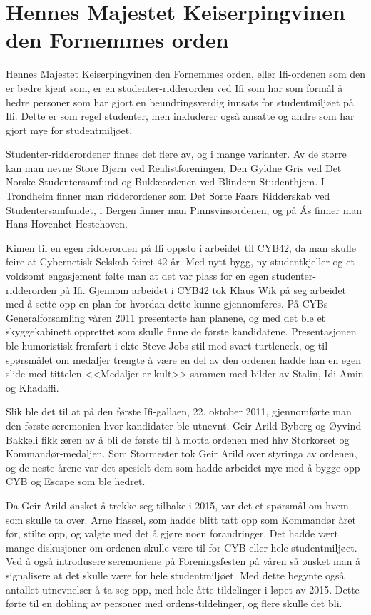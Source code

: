 \chapter[Ifi-ordenen]{Hennes Majestet Keiserpingvinen den Fornemmes orden}

\author{Skrevet av Arne Hassel}

Hennes Majestet Keiserpingvinen den Fornemmes orden, eller Ifi-ordenen som den er bedre kjent som, er en studenter-ridderorden ved Ifi som har som formål å hedre personer som har gjort en beundringsverdig innsats for studentmiljøet på Ifi. Dette er som regel studenter, men inkluderer også ansatte og andre som har gjort mye for studentmiljøet.

Studenter-ridderordener finnes det flere av, og i mange varianter. Av de større kan man nevne Store Bjørn ved Realistforeningen, Den Gyldne Gris ved Det Norske Studentersamfund og Bukkeordenen ved Blindern Studenthjem. I Trondheim finner man ridderordener som Det Sorte Faars Ridderskab ved Studentersamfundet, i Bergen finner man Pinnsvinsordenen, og på Ås finner man Hans Hovenhet Hestehoven.

Kimen til en egen ridderorden på Ifi oppsto i arbeidet til CYB42, da man skulle feire at Cybernetisk Selskab feiret 42 år. Med nytt bygg, ny studentkjeller og et voldsomt engasjement følte man at det var plass for en egen studenter-ridderorden på Ifi. Gjennom arbeidet i CYB42 tok Klaus Wik på seg arbeidet med å sette opp en plan for hvordan dette kunne gjennomføres. På CYBs Generalforsamling våren 2011 presenterte han planene, og med det ble et skyggekabinett opprettet som skulle finne de første kandidatene. Presentasjonen ble humoristisk fremført i ekte Steve Jobs-stil med svart turtleneck, og til spørsmålet om medaljer trengte å være en del av den ordenen hadde han en egen slide med tittelen <<Medaljer er kult>> sammen med bilder av Stalin, Idi Amin og Khadaffi.

Slik ble det til at på den første Ifi-gallaen, 22. oktober 2011, gjennomførte man den første seremonien hvor kandidater ble utnevnt. Geir Arild Byberg og Øyvind Bakkeli fikk æren av å bli de første til å motta ordenen med hhv Storkorset og Kommandør-medaljen. Som Stormester tok Geir Arild over styringa av ordenen, og de neste årene var det spesielt dem som hadde arbeidet mye med å bygge opp CYB og Escape som ble hedret.

Da Geir Arild ønsket å trekke seg tilbake i 2015, var det et spørsmål om hvem som skulle ta over. Arne Hassel, som hadde blitt tatt opp som Kommandør året før, stilte opp, og valgte med det å gjøre noen forandringer. Det hadde vært mange diskusjoner om ordenen skulle være til for CYB eller hele studentmiljøet. Ved å også introdusere seremoniene på Foreningsfesten på våren så ønsket man å signalisere at det skulle være for hele studentmiljøet. Med dette begynte også antallet utnevnelser å ta seg opp, med hele åtte tildelinger i løpet av 2015. Dette førte til en dobling av personer med ordens-tildelinger, og flere skulle det bli.

